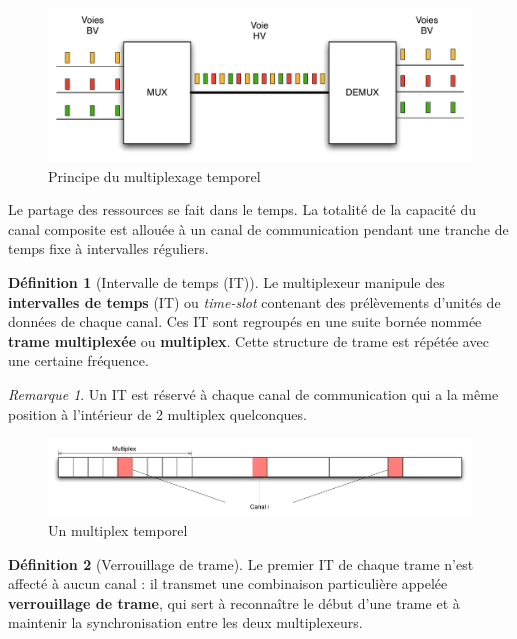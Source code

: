 \documentclass[11pt,english,french]{scrreprt}
\theoremstyle{remark}
\newtheorem*{rem*}{Remarque}
\theoremstyle{definition}
\newtheorem*{def*}{Définition}
\begin{document}
\begin{figure}[h!]
	\center
	\includegraphics[scale=.75]{graphes/multiplexage-temporel}
	\caption{Principe du multiplexage temporel}
\end{figure}

Le partage des ressources se fait dans le temps. La totalité de la capacité du canal composite est allouée à un canal de communication pendant une tranche de temps fixe à intervalles réguliers. 

\begin{def*}[Intervalle de temps (IT)]
	Le multiplexeur manipule des \textbf{intervalles de temps} (IT) ou \emph{time-slot} contenant des prélèvements d'unités de données de chaque canal. Ces IT sont regroupés en une suite bornée nommée \textbf{trame multiplexée} ou \textbf{multiplex}. Cette structure de trame est répétée avec une certaine fréquence. 
\end{def*}

\begin{rem*}
	Un IT est réservé à chaque canal de communication qui a la même position à l'intérieur de 2 multiplex quelconques.
\end{rem*}

\begin{figure}[h!]
	\center
	\includegraphics[scale=.5]{graphes/multiplex-temporel}
	\caption{Un multiplex temporel}
\end{figure}

\begin{def*}[Verrouillage de trame]
	Le premier IT de chaque trame n'est affecté à aucun canal : il transmet une combinaison particulière appelée \textbf{verrouillage de trame}, qui sert à reconnaître le début d'une trame et à maintenir la synchronisation entre les deux multiplexeurs.
\end{def*}
\end{document}
